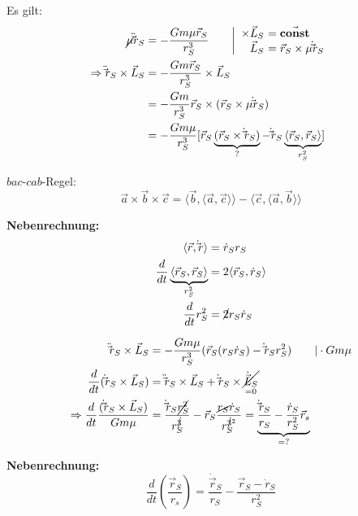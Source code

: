 Es gilt:
\begin{align*}
    \cancel{\mu} \ddot \vec r_S &= -\frac{Gm\mu \vec r_S}{r_S^3} \tag*{$\left| \begin{array}{r@{\ }l}
        \times \vec L_S &= \vec{\mathbf{const}} \\
               \vec L_S &= \vec r_S \times \mu \dot \vec r_S
    \end{array} \right.$} \\
    \Rightarrow \ddot \vec r_S \times \vec L_S &= - \frac{G m \vec r_S}{r_S^3} \times \vec L_S \\
        &= - \frac{Gm}{r_S^3} \vec r_S \times (\vec r_S \times \mu \dot \vec r_S) \\
        &= - \frac{Gm\mu}{r_S^3} [\vec r_S \underbrace{(\vec r_S \times \dot \vec r_S)}_{?} 
            - \dot \vec r_S \underbrace{\langle\vec r_S, \vec r_S\rangle}_{r_S^2}]
\end{align*}

$bac$-$cab$-Regel:
\[ \vec a \times \vec b \times \vec c = \langle \vec b, \langle \vec a, \vec c\rangle\rangle - \langle\vec c, \langle \vec a, \vec b\rangle\rangle \]

\color{OliveGreen}
\textbf{Nebenrechnung:}
\begin{align*}
    \langle\vec r, \dot\vec r\rangle &= \dot r_S r_S \\
    \frac{d}{dt} \underbrace{\langle \vec r_S, \vec r_S\rangle}_{r_S^2} &= 2 \langle \vec r_S, \dot r_S \rangle \\
    \frac{d}{dt} r_S^2 &= \cancel{2} r_S \dot r_S
\end{align*}
\color{black}

\begin{align*}
    \ddot \vec r_S \times \vec L_S &= - \frac{Gm \mu}{r_S^3} (\vec r_S (r_S \dot r_S) - \dot \vec r_S r_S^2) \tag*{$| \cdot Gm\mu$} \\
    \frac{d}{dt} (\dot \vec r_S \times \vec L_S) &= \ddot \vec r_S \times \vec L_S + \dot \vec r_S \times \underset{=0}{\cancel{\dot{\vec{L}}_S}} \\
    \Rightarrow \frac{d}{dt} \frac{(\dot \vec r_S \times \vec L_S)}{G m \mu} &= \frac{\dot \vec r_S \cancel{r_S^2}}{r_S^{\cancel{3}}} - \vec r_S \frac{\cancel{r_S} \dot r_S}{r_S^{\cancel{3}^2}} =
    \underbrace{\frac{\dot \vec r_S}{r_S} - \frac{\dot r_S}{r_S^2} \vec r_s}_{= ?}
\end{align*}

\color{OliveGreen}
\textbf{Nebenrechnung:}
\[ \frac{d}{dt} \left(\frac{\vec r_S}{r_s}\right) = \frac{\dot \vec r_S}{r_S} - \frac{\vec r_S - \dot r_S}{r_S^2} \]
\color{black}

